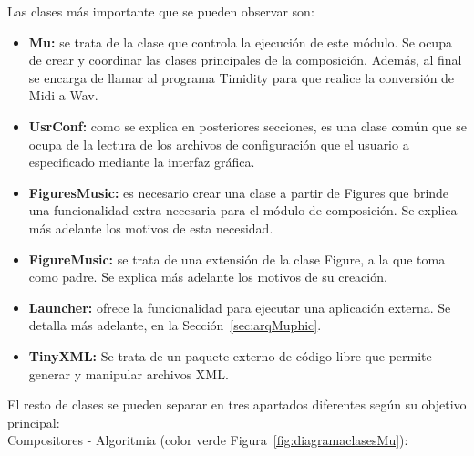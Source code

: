 Las clases más importante que se pueden observar son:

\begin{itemize}

	\item \textbf{Mu:} se trata de la clase que controla la ejecución de este módulo. Se ocupa de crear y coordinar las clases principales de la composición. Además, al final se encarga de llamar al programa Timidity para que realice la conversión de Midi a Wav.
	
	\item \textbf{UsrConf:} como se explica en posteriores secciones, es una clase común que se ocupa de la lectura de los archivos de configuración que el usuario a especificado mediante la interfaz gráfica.
	
	\item \textbf{FiguresMusic:} es necesario crear una clase a partir de Figures que brinde una funcionalidad extra necesaria para el módulo de composición. Se explica más adelante los motivos de esta necesidad.
	
	\item \textbf{FigureMusic:} se trata de una extensión de la clase Figure, a la que toma como padre. Se explica más adelante los motivos de su creación.

	\item \textbf{Launcher:} ofrece la funcionalidad para ejecutar una aplicación externa. Se detalla más adelante, en la Sección~\ref{sec:arqMuphic}.

	\item \textbf{TinyXML:} Se trata de un paquete externo de código libre que permite generar y manipular archivos XML.

\end{itemize}

El resto de clases se pueden separar en tres apartados diferentes según su objetivo principal:\\

Compositores - Algoritmia (color verde Figura~\ref{fig:diagramaclasesMu}):

